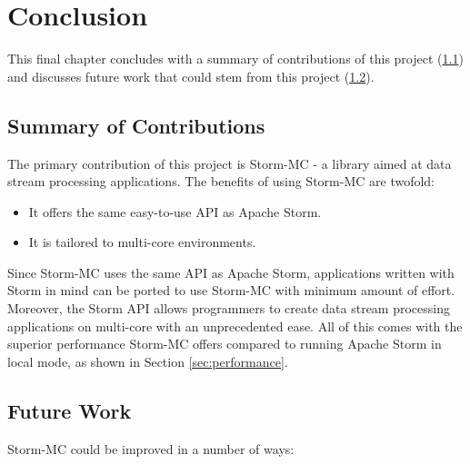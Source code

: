 \chapter{Conclusion}

This final chapter concludes with a summary of contributions of this project (\ref{sec:contribs}) and discusses future work that could stem from this project (\ref{sec:future_work}).

\section{Summary of Contributions}
\label{sec:contribs}

The primary contribution of this project is Storm-MC - a library aimed at data stream processing applications. The benefits of using Storm-MC are twofold:

\begin{itemize}
\item It offers the same easy-to-use API as Apache Storm.
\item It is tailored to multi-core environments.
\end{itemize}

Since Storm-MC uses the same API as Apache Storm, applications written with Storm in mind can be ported to use Storm-MC with minimum amount of effort. Moreover, the Storm API allows programmers to create data stream processing applications on multi-core with an unprecedented ease. All of this comes with the superior performance Storm-MC offers compared to running Apache Storm in local mode, as shown in Section \ref{sec:performance}.

\section{Future Work}
\label{sec:future_work}

Storm-MC could be improved in a number of ways:

